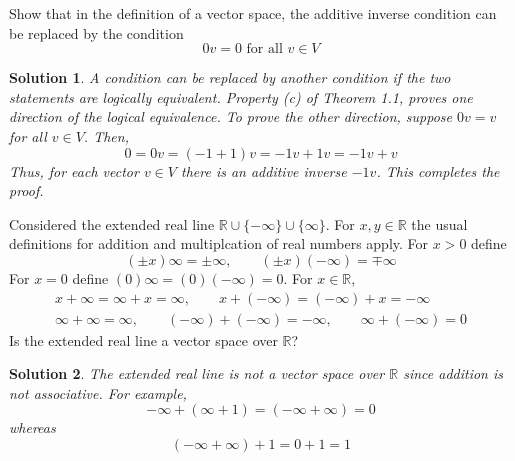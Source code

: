 \documentclass{book}
\newcommand{\real}{\mathbb{R}}
\newtheorem*{soln}{Solution}
\theoremstyle{definition}
\begin{document}
\begin{problem}
    Show that in the definition of a vector space, the additive inverse
    condition can be replaced by the condition
    \[
        0v=0\text{ for all } v\in V
    \]
\end{problem}

\begin{soln}
    A condition can be replaced by another condition if the two statements are
    logically equivalent. Property (c) of Theorem 1.1, proves one direction of the
    logical equivalence. To prove the other direction, suppose $0v=v$ for all $v
    \in V$. Then,
    \begin{equation*}
        0 = 0v = (-1+1)v = -1v+1v = -1v+v
    \end{equation*}
    Thus, for each vector $v\in V$ there is an additive inverse $-1v$. This
    completes the proof. 
\end{soln}

\begin{problem}
    Considered the extended real line $\real\cup\{-\infty\}\cup\{\infty\}$. For
    $x,y\in\real$ the usual definitions for addition and multiplcation of real
    numbers apply. For $x>0$ define
    \begin{equation*}
        (\pm x)\infty = \pm \infty,\qquad (\pm x) (-\infty) = \mp \infty
    \end{equation*}
    For $x= 0$ define $(0)\infty = (0)(-\infty) = 0$. For $x\in\real$, 
    \begin{gather*}
        x+\infty=\infty+x=\infty, \qquad x+(-\infty)=(-\infty)+x=-\infty \\
        \infty +\infty = \infty, \qquad (-\infty)+(-\infty)=-\infty, \qquad
        \infty+(-\infty)=0
    \end{gather*}
    Is the extended real line a vector space over $\real$?
\end{problem}

\begin{soln}
    The extended real line is not a vector space over $\real$ since addition is
    not associative. For example,
    \begin{equation*}
        -\infty+(\infty+1) = (-\infty+\infty) = 0
    \end{equation*}
    whereas
    \begin{equation*}
        (-\infty+\infty)+1 = 0+1 = 1
    \end{equation*}
\end{soln}
\end{document}
